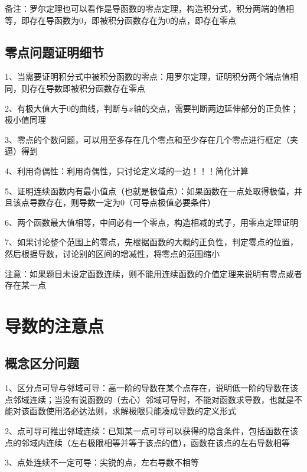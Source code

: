 备注：罗尔定理也可以看作是导函数的零点定理，构造积分式，积分两端的值相等，即存在导函数为0，即被积分函数存在为0的点，即存在零点



\subsection{零点问题证明细节}

1、当需要证明积分式中被积分函数的零点：用罗尔定理，证明积分两个端点值相同，则存在导数即被积分函数存在零点

2、有极大值大于0的曲线，判断与$x$轴的交点，需要判断两边延伸部分的正负性；极小值同理

3、零点的个数问题，可以用至多存在几个零点和至少存在几个零点进行框定（夹逼）得到

4、利用奇偶性：利用奇偶性，只讨论定义域的一边！！！简化计算

5、证明连续函数内有最小值点（也就是极值点）：如果函数在一点处取得极值，并且该点导数存在，则导数一定为0（可导点极值必要条件）

6、两个函数最大值相等，中间必有一个零点，构造相减的式子，用零点定理证明

7、如果讨论整个范围上的零点，先根据函数的大概的正负性，判定零点的位置，然后根据导数，讨论别的区间的增减性，将零点的范围缩小

注意：如果题目未设定函数连续，则不能用连续函数的介值定理来说明有零点或者存在某一点



\section{导数的注意点}



\subsection{概念区分问题}

1、区分点可导与邻域可导：高一阶的导数在某个点存在，说明低一阶的导数在该点邻域连续；当没有说函数的（去心）邻域可导时，不能对函数求导数，也就是不能对该函数使用洛必达法则，求解极限只能凑成导数的定义形式

2、点可导可推出邻域连续：已知某一点可导可以获得的隐含条件，包括函数在该点的邻域内连续（左右极限相等并等于该点的值），函数在该点的左右导数相等

3、点处连续不一定可导：尖锐的点，左右导数不相等

